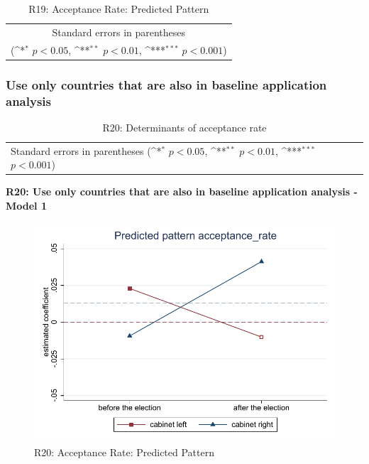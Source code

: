 \documentclass[10pt,a4paper]{scrartcl}
\begin{document}
\begin{table}[!ht]\centering
	\footnotesize
	\renewcommand{\arraystretch}{1.2}
	\def\sym#1{\ifmmode^{#1}\else\(^{#1}\)\fi}
	\caption{R19: Acceptance Rate: Predicted Pattern}
	\begin{tabular}{l*{2}{c}}
		\hline\hline
		
		\hline\hline
		\multicolumn{3}{c}{\footnotesize Standard errors in parentheses} \\
		\multicolumn{3}{c}{\footnotesize (\sym{*} \(p<0.05\), \sym{**} \(p<0.01\), \sym{***} \(p<0.001\))} \\
	\end{tabular}
\end{table}





\clearpage
\FloatBarrier
\subsubsection{Use only countries that are also in baseline application analysis}
\begin{table}[!ht]\centering
	\renewcommand{\arraystretch}{1.25}
	\small
	\def\sym#1{\ifmmode^{#1}\else\(^{#1}\)\fi}
	\caption{R20: Determinants of acceptance rate}
	\begin{tabular}{l*{3}{c}}
		\hline\hline
		
		\hline\hline
		\multicolumn{4}{l}{\footnotesize Standard errors in parentheses (\sym{*} \(p<0.05\), \sym{**} \(p<0.01\), \sym{***} \(p<0.001\))}\\
	\end{tabular}
\end{table}

\clearpage
\textbf{R20: Use only countries that are also in baseline application analysis - Model 1}
\begin{figure}[!ht]
	\centering
	\includegraphics[width=1\textwidth]{figures_edited/acceptance_rate_graph1_R20.pdf}
	\caption{R20: Acceptance Rate: Predicted Pattern}
\end{figure}
\end{document}
